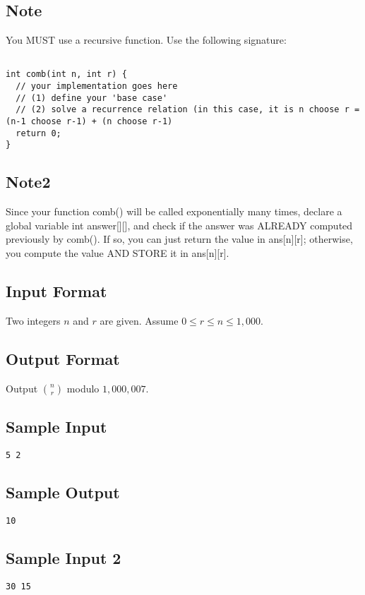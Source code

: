 \subsection*{Note}
You MUST use a recursive function. Use the following signature:
\begin{verbatim}

int comb(int n, int r) {
  // your implementation goes here
  // (1) define your 'base case'
  // (2) solve a recurrence relation (in this case, it is n choose r = (n-1 choose r-1) + (n choose r-1)
  return 0;
}
\end{verbatim}

\subsection*{Note2}
Since your function comb() will be called exponentially many times, declare a global variable int answer[][], and check if the answer was ALREADY computed previously by comb(). If so, you can just return the value in ans[n][r]; otherwise, you compute the value AND STORE it in ans[n][r].

\subsection*{Input Format}
Two integers $n$ and $r$ are given. Assume $0\leq r \leq n \leq 1,000$.

\subsection*{Output Format}
Output $\binom{n}{r}$ modulo $1,000,007$. 

\subsection*{Sample Input}
\begin{verbatim}
5 2
\end{verbatim}

\subsection*{Sample Output}
\begin{verbatim}
10
\end{verbatim}

\subsection*{Sample Input 2}
\begin{verbatim}
30 15
\end{verbatim}

